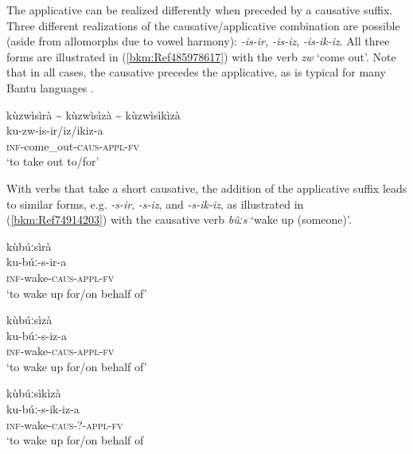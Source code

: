 The applicative can be realized differently when preceded by a causative suffix. Three different realizations of the causative/applicative combination are possible (aside from allomorphs due to vowel harmony): \textit{-is-ir, -is-iz}, \textit{-is-ik-iz}. All three forms are illustrated in (\ref{bkm:Ref485978617}) with the verb \textit{zw} ‘come out’. Note that in all cases, the causative precedes the applicative, as is typical for many Bantu languages \citep{Hyman2003b}.

\ea
\label{bkm:Ref485978617}
kùzwìsìrà {\textasciitilde} kùzwìsìzà {\textasciitilde} kùzwìsìkìzà\\
ku-zw-is-ir/iz/ikiz-a\\
\textsc{inf}-come\_out-\textsc{caus}-\textsc{appl}-\textsc{fv}\\
\glt ‘to take out to/for’
\z

With verbs that take a short causative, the addition of the applicative suffix leads to similar forms, e.g. \textit{-s-ir}, \textit{-s-iz}, and \textit{-s-ik-iz}, as illustrated in (\ref{bkm:Ref74914203}) with the causative verb \textit{bûːs} ‘wake up (someone)’.

\ea
\label{bkm:Ref74914203}
\glll kùbúːsìrà\\
ku-búː-s-ir-a\\
\textsc{inf}-wake-\textsc{caus}-\textsc{appl}-\textsc{fv}\\
\glt ‘to wake up for/on behalf of’
\z

\ea
\glll kùbúːsìzà\\
ku-búː-s-iz-a\\
\textsc{inf}-wake-\textsc{caus}-\textsc{appl}-\textsc{fv}\\
\glt ‘to wake up for/on behalf of’
\z

\ea
\glll kùbúːsìkìzà\\
ku-búː-s-ik-iz-a\\
\textsc{inf}-wake-\textsc{caus}-?-\textsc{appl}-\textsc{fv}\\
\glt ‘to wake up for/on behalf of
\z

